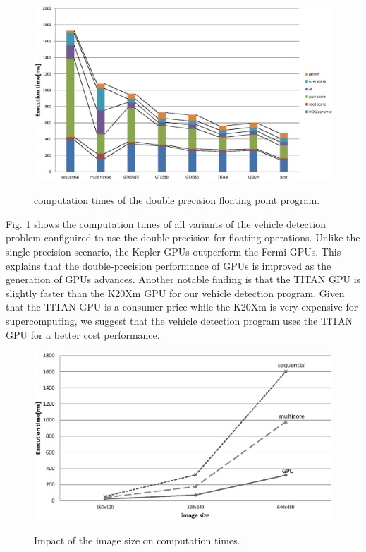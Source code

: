 \begin{figure}[t]
 \begin{center}
  \includegraphics[width=\hsize]{fig/double_exe_time.eps}\\
  \caption{computation times of the double precision floating point program.}
  \label{fig:double_exe_time}
 \end{center}
\end{figure}

Fig. \ref{fig:double_exe_time} shows the computation times of all variants
of the vehicle detection problem configuired to use the double precision
for floating operations.
Unlike the single-precision scenario, the Kepler GPUs outperform the
Fermi GPUs.
This explains that the double-precision performance of GPUs is improved
as the generation of GPUs advances.
Another notable finding is that the TITAN GPU is slightly faster than
the K20Xm GPU for our vehicle detection program.
Given that the TITAN GPU is a consumer price while the K20Xm is very
expensive for supercomputing, we suggest that the vehicle detection
program uses the TITAN GPU for a better cost performance.

\begin{figure}[t]
 \begin{center}
  \includegraphics[width=\hsize]{fig/time_on_image_size.eps}\\
  \caption{Impact of the image size on computation times.}
  \label{fig:time_on_image_size}
 \end{center}
\end{figure}

